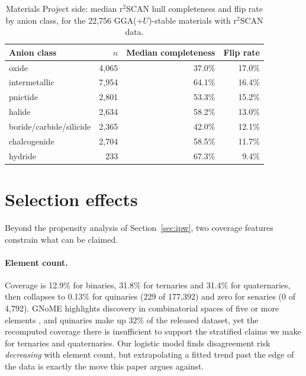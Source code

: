 \documentclass[11pt]{article}
\begin{document}
\begin{table}[htbp]\centering
\caption{Materials Project side: median r$^2$SCAN hull completeness and flip rate by
anion class, for the 22{,}756 GGA(+$U$)-stable materials with r$^2$SCAN data.}
\label{tab:mpcompl}
\small\begin{tabular}{lrrr}
\toprule
Anion class & $n$ & Median completeness & Flip rate \\
\midrule
oxide                   & 4{,}065 & 37.0\% & 17.0\% \\
intermetallic           & 7{,}954 & 64.1\% & 16.4\% \\
pnictide                & 2{,}801 & 53.3\% & 15.2\% \\
halide                  & 2{,}634 & 58.2\% & 13.0\% \\
boride/carbide/silicide & 2{,}365 & 42.0\% & 12.1\% \\
chalcogenide            & 2{,}704 & 58.5\% & 11.7\% \\
hydride                 & \phantom{0,}233 & 67.3\% & \phantom{0}9.4\% \\
\bottomrule
\end{tabular}
\end{table}

\section{Selection effects}\label{sec:selection}

Beyond the propensity analysis of Section~\ref{sec:ipw}, two coverage features constrain
what can be claimed.

\paragraph{Element count.} Coverage is 12.9\% for binaries, 31.8\% for ternaries and
31.4\% for quaternaries, then collapses to 0.13\% for quinaries (229 of 177{,}392) and
zero for senaries (0 of 4{,}792). GNoME highlights discovery in combinatorial spaces of five or more elements
\citep{merchant2023}, and quinaries make up 32\% of the released dataset, yet
the recomputed coverage there is insufficient to support the stratified claims we make
for ternaries and quaternaries. Our logistic model finds disagreement risk
\emph{decreasing} with element count, but extrapolating a fitted trend past the edge of
the data is exactly the move this paper argues against.
\end{document}
